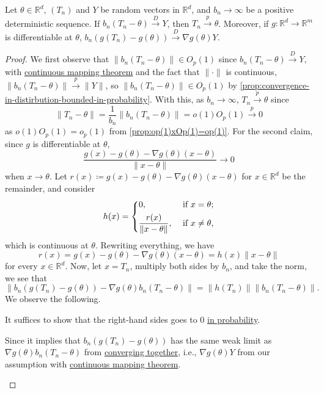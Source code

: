 \begin{theorem}\label{thm:delta-method}
	Let \(\theta \in \mathbb{R} ^d\), \((T_n)\) and \(Y\) be random vectors in \(\mathbb{R} ^d\), and \(b_n \to \infty \) be a positive deterministic sequence. If \(b_n (T_n - \theta ) \overset{D}{\to } Y\), then \(T_n \overset{p}{\to } \theta \). Moreover, if \(g \colon \mathbb{R} ^d \to \mathbb{R} ^m\) is differentiable at \(\theta \), \(b_n (g(T_n) - g(\theta )) \overset{D}{\to } \nabla g(\theta ) Y\).
\end{theorem}
\begin{proof}
	We first observe that \(\lVert b_n (T_n - \theta ) \rVert \in O_p(1)\) since \(b_n(T_n - \theta ) \overset{D}{\to } Y\), with \hyperref[thm:continuous-mapping]{continuous mapping theorem} and the fact that \(\lVert \cdot \rVert \) is continuous, \(\lVert b_n (T_n - \theta ) \rVert \overset{p}{\to } \lVert Y \rVert \), so \(\lVert b_n (T_n - \theta ) \rVert \in O_p(1)\) by \autoref{prop:convergence-in-distirbution-bounded-in-probability}. With this, as \(b_n \to \infty \), \(T_n \overset{p}{\to } \theta \) since
	\[
		\lVert T_n - \theta \rVert
		= \frac{1}{b_n} \lVert b_n (T_n - \theta ) \rVert
		= o(1) O_p(1)
		\overset{p}{\to } 0
	\]
	as \(o(1) O_p(1) = o_p(1)\) from \autoref{prop:op(1)xOp(1)=op(1)}. For the second claim, since \(g\) is differentiable at \(\theta \),
	\[
		\frac{g(x) - g(\theta ) - \nabla g(\theta ) (x - \theta )}{\lVert x - \theta \rVert } \to 0
	\]
	when \(x \to \theta \). Let \(r(x) \coloneqq g(x) - g(\theta ) - \nabla g(\theta ) (x - \theta )\) for \(x \in \mathbb{R} ^d\) be the remainder, and consider
	\[
		h(x) = \begin{dcases}
			0,                                       & \text{ if } x = \theta  ;   \\
			\frac{r(x)}{\lVert x - \theta  \rVert }, & \text{ if } x \neq \theta ,
		\end{dcases}
	\]
	which is continuous at \(\theta \). Rewriting everything, we have
	\[
		r(x)
		= g(x) - g(\theta ) - \nabla g(\theta ) (x - \theta )
		= h(x) \lVert x - \theta \rVert
	\]
	for every \(x \in \mathbb{R} ^d\). Now, let \(x = T_n\), multiply both sides by \(b_n\), and take the norm, we see that
	\[
		\left\lVert b_n \left( g(T_n) - g(\theta ) \right)  - \nabla g(\theta ) b_n (T_n - \theta ) \right\rVert
		= \lVert h(T_n) \rVert \lVert  b_n (T_n - \theta ) \rVert.
	\]
	We observe the following.

	\begin{claim}
		It suffices to show that the right-hand sides goes to \(0\) \hyperref[def:converge-in-probability]{in probability}.
	\end{claim}
	\begin{explanation}
		Since it implies that \(b_n(g(T_n) - g(\theta ))\) has the same weak limit as \(\nabla g(\theta ) b_n (T_n - \theta )\) from \hyperref[thm:converging-together]{converging together}, i.e., \(\nabla g(\theta ) Y\) from our assumption with \hyperref[thm:continuous-mapping]{continuous mapping theorem}.
	\end{explanation}


\end{proof}
